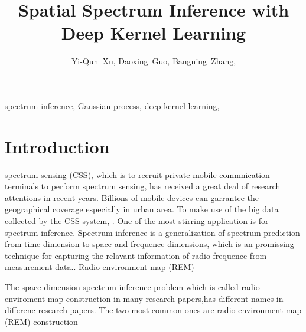 \documentclass[journal, oneside, twocolumn]{IEEEtran}
\date{}
\title{Spatial Spectrum Inference with Deep Kernel Learning}
\begin{document}
\author{
Yi-Qun~Xu,
Daoxing~Guo,%
Bangning~Zhang,%

}


\maketitle


\begin{abstract}

\end{abstract}


\begin{IEEEkeywords}
spectrum inference, Gaussian process, deep kernel learning, 
\end{IEEEkeywords}

\section{Introduction}
 spectrum sensing (CSS), which is to recruit private mobile commnication terminals to perform spectrum sensing, has received a great deal of research attentions \cite{Ding2014, Jin2018, Han2019, Hu2020, Amin2020} in recent years. Billions of mobile devices can garrantee the geographical coverage especially in urban area. To make use of the big data collected by the CSS system, . One of the most stirring application is for spectrum inference. Spectrum inference is a generalization of spectrum prediction from time dimension to space and frequence dimensions, which is an promissing technique for capturing the relavant information of radio frequence from measurement data.\cite{Ding2018}. Radio environment map (REM) 



The space dimension spectrum inference problem which is called radio enviroment map construction in many research papers,has different names in differenc research papers. The two most common ones are radio environment map (REM) construction \cite{Phillips2012, Pesko2014, Sato2017, Li2018, Katagiri2020}  
\end{document}
